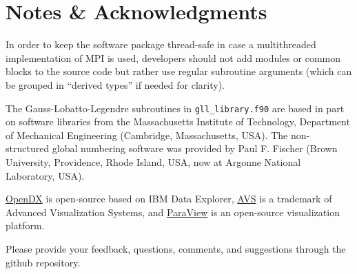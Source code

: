 
\chapter*{Notes \& Acknowledgments}

In order to keep the software package thread-safe in case a multithreaded
implementation of MPI is used, developers should not add modules or
common blocks to the source code but rather use regular subroutine
arguments (which can be grouped in ``derived types'' if needed for
clarity).\newline

The Gauss-Lobatto-Legendre subroutines in \texttt{gll\_library.f90}
are based in part on software libraries from the Massachusetts Institute
of Technology, Department of Mechanical Engineering (Cambridge, Massachusetts,
USA). The non-structured global numbering software was provided by
Paul F. Fischer (Brown University, Providence, Rhode Island, USA,
now at Argonne National Laboratory, USA).\newline

\href{http://www.opendx.org}{OpenDX} is open-source
based on IBM Data Explorer, \href{http://www.avs.com}{AVS}
is a trademark of Advanced Visualization Systems, and \href{http://www.paraview.org}{ParaView}
is an open-source visualization platform.\newline

Please provide your feedback, questions, comments, and suggestions through the github repository.

